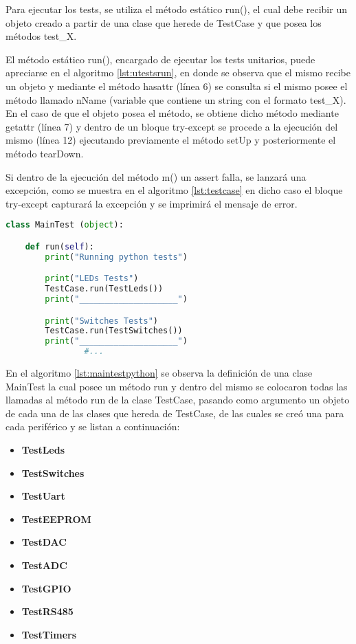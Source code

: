 Para ejecutar los tests, se utiliza el método estático run(), el cual debe recibir un objeto creado a partir de una clase que herede de TestCase y que posea los métodos test\_X.

El método estático run(), encargado de ejecutar los tests unitarios, puede apreciarse en el algoritmo \ref{lst:utestsrun}, en donde se observa que el mismo recibe un objeto y mediante el método hasattr (línea 6) se consulta si el mismo posee el método llamado nName (variable que contiene un string con el formato test\_X). En el caso de que el objeto posea el método, se obtiene dicho método mediante getattr (línea 7) y dentro de un bloque try-except se procede a la ejecución del mismo (línea 12) ejecutando previamente el método setUp y posteriormente el método tearDown.

Si dentro de la ejecución del método m() un assert falla, se lanzará una excepción, como se muestra en el algoritmo \ref{lst:testcase} en dicho caso el bloque try-except capturará la excepción y se imprimirá el mensaje de error.

\begin{lstlisting}[label={lst:maintestpython},caption=Clase MainTest desde donde se ejecutan todos los tests Python., language={python}]
class MainTest (object):

    def run(self):
        print("Running python tests")

        print("LEDs Tests")
        TestCase.run(TestLeds())
        print("____________________")

        print("Switches Tests")
        TestCase.run(TestSwitches())
        print("____________________")
				#...

\end{lstlisting}
 
En el algoritmo \ref{lst:maintestpython} se observa la definición de una clase MainTest la cual posee un método run y dentro del mismo se colocaron todas las llamadas al método run de la clase TestCase, pasando como argumento un objeto de cada una de las clases que hereda de TestCase, de las cuales se creó una para cada periférico y se listan a continuación:

\begin{itemize}
	\item \textbf{TestLeds}
	\item \textbf{TestSwitches}
	\item \textbf{TestUart}
	\item \textbf{TestEEPROM}
	\item \textbf{TestDAC}
	\item \textbf{TestADC}
	\item \textbf{TestGPIO}
	\item \textbf{TestRS485}	
	\item \textbf{TestTimers}
\end{itemize}

